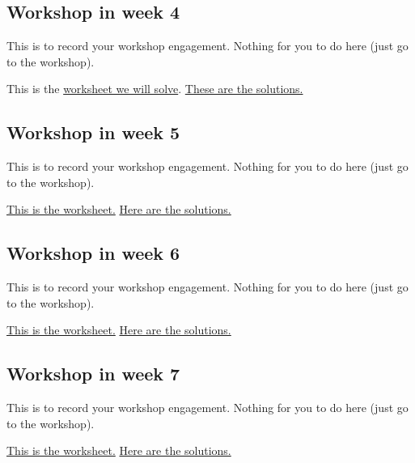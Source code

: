 \documentclass{amsart}
\begin{document}
\subsection{Workshop in week 4}
\label{sec:org37d6790}
This is to record your workshop engagement.  Nothing for you to do here (just go to the workshop).

This is the \href{https://canvas.anu.edu.au/files/741497/download?download\_frd=1\&verifier=NNABH8I4s7UNE1LPuf8YteHPFmwTGhZOuEO76dib}{worksheet we will solve}.
\href{https://canvas.anu.edu.au/files/757549/download?download\_frd=1\&verifier=nmQVYDUpzcXuuWTWaUWdwIoZQ4P9P4I62wKUurY3}{These are the solutions.}
\subsection{Workshop in week 5}
\label{sec:org996ae9b}
This is to record your workshop engagement.  Nothing for you to do here (just go to the workshop).

\href{https://canvas.anu.edu.au/files/759184/download?download\_frd=1\&verifier=NDB68ZlBP5WXOG0JFYSiO9PKjub9wfUZnuoyLyW2}{This is the worksheet.}
\href{https://canvas.anu.edu.au/files/778182/download?download\_frd=1\&verifier=gAQIyeF4ImaGOlTf5HxuVyOjouENuKUpviqqhWgu}{Here are the solutions.}
\subsection{Workshop in week 6}
\label{sec:orgdedb5e4}
This is to record your workshop engagement.  Nothing for you to do here (just go to the workshop).

\href{https://canvas.anu.edu.au/files/779144/download?download\_frd=1\&verifier=3548NOHUS1N7zmv2BYsn0H8SxILPzhvTMALide17}{This is the worksheet.} 
\href{https://canvas.anu.edu.au/files/847725/download?download\_frd=1\&verifier=KveqL5tvm1iBWGr0a6FPmpvg0QG04NCuKhjevWqw}{Here are the solutions.}
\subsection{Workshop in week 7}
\label{sec:orgcfb3102}
This is to record your workshop engagement.  Nothing for you to do here (just go to the workshop).

\href{https://canvas.anu.edu.au/files/828520/download?download\_frd=1\&verifier=OgBkNdBBIjIjoKKZ8pzl1lCAsxtiVj64YrXlKABV}{This is the worksheet.}
\href{https://canvas.anu.edu.au/files/847728/download?download\_frd=1\&verifier=zxR4bgdnFKv3pZDB5qYfTjd31lbpyul1lQ3mGzEO}{Here are the solutions.}
\end{document}
